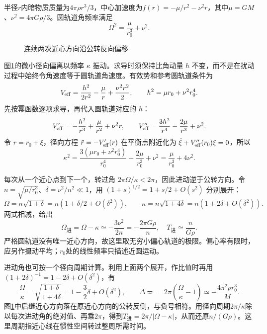 \begin{solution}
半径$r$内暗物质质量为$4\pi\rho r^3/3$，中心加速度为$f(r)=-\mu/r^2-\nu^2r$，其中$\mu=GM$、$\nu^2=4\pi G\rho/3$。圆轨道角频率满足
\[
 \Omega^2=\frac{\mu}{r_0^3}+\nu^2.
\]

\begin{figure}[H]\centering
{}
\caption{连续两次近心方向沿公转反向偏移}\label{fig:hw8-5-s}
\end{figure}

图\ref{fig:hw8-5-s}的微小径向偏离以频率 $\kappa$ 振动。求导时须保持比角动量 $h$ 不变，而不是在扰动过程中始终令角速度等于圆轨道角速度。有效势和参考圆轨道条件为
\[
 V_{\rm eff}=\frac{h^2}{2r^2}-\frac\mu r+\frac{\nu^2r^2}{2},\qquad
 h^2=\mu r_0+\nu^2r_0^4.
\]
先按幂函数逐项求导，再代入圆轨道对应的 $h$：
\[
V_{\rm eff}'=-\frac{h^2}{r^3}+\frac\mu{r^2}+\nu^2r,\qquad
V_{\rm eff}''=\frac{3h^2}{r^4}-\frac{2\mu}{r^3}+\nu^2.
\]
令 $r=r_0+\xi$，径向方程 $\ddot r=-V_{\rm eff}'(r)$ 在平衡点附近化为 $\ddot\xi+V_{\rm eff}''(r_0)\xi=0$，所以
\[
\kappa^2=\frac{3(\mu r_0+\nu^2r_0^4)}{r_0^4}-\frac{2\mu}{r_0^3}+\nu^2
=\frac\mu{r_0^3}+4\nu^2.
\]

每次从一个近心点到下一个，转过角 $2\pi\Omega/\kappa<2\pi$，因此进动逆于公转方向。令 $n=\sqrt{\mu/r_0^3}$、$\delta=\nu^2/n^2\ll1$，用 $(1+s)^{1/2}=1+s/2+O(s^2)$ 分别展开：
\[
\Omega=n\sqrt{1+\delta}=n(1+\delta/2+O(\delta^2)),\qquad
\kappa=n\sqrt{1+4\delta}=n(1+2\delta+O(\delta^2)).
\]
两式相减，给出
\[
 \Omega_{\text{进}}=\Omega-\kappa\simeq-\frac{3\nu^2}{2n}
 =-\frac{2\pi G\rho}{n},\quad
 \boxed{T_{\text{进}}\simeq\frac{n}{G\rho}}.
\]
严格圆轨道没有唯一近心方向，故这里取无穷小偏心轨道的极限。偏心率有限时，应另作摄动平均；$r_0$处的线性频率只描述近圆运动。


进动角也可按一个径向周期计算。利用上面两个展开，作比值时再用 $(1+2\delta)^{-1}=1-2\delta+O(\delta^2)$，有
\[
 \frac\Omega\kappa=\sqrt{\frac{1+\delta}{1+4\delta}}
 =1-\frac32\delta+O(\delta^2),
 \qquad
 \Delta\varpi=2\pi\left(\frac\Omega\kappa-1\right)
 \simeq-\frac{4\pi^2\rho r_0^3}{M}.
\]
图\ref{fig:hw8-5-s}中后继近心方向落在原近心方向的公转反侧，与负号相符。用径向周期$2\pi/\kappa$除以每次进动角的绝对值、再乘$2\pi$，得到$T_{\text{进}}=2\pi/|\Omega-\kappa|$，从而还原$n/(G\rho)$。这里周期指近心线在惯性空间转过整周所需时间。

\end{solution}



